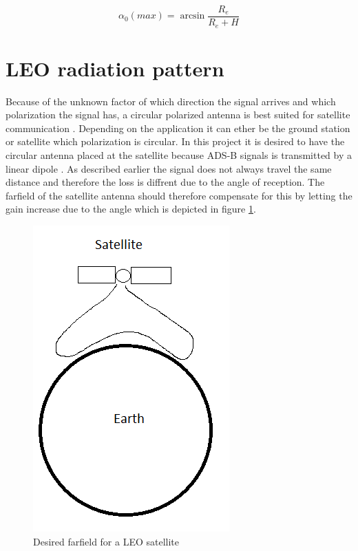\begin{equation}
\alpha_0(max) = \arcsin{\frac{R_e}{R_e+H}}
\end{equation}
\label{eq:max_cov} 

\section{LEO radiation pattern}
Because of the unknown factor of which direction the signal arrives and which polarization the signal has, a circular polarized antenna is best suited for satellite communication \citep{Balanis2005}. Depending on the application it can ether be the ground station or satellite which polarization is circular. In this project it is desired to have the circular antenna placed at the satellite because ADS-B signals is transmitted by a linear dipole \citep{itu2017}. As described earlier the signal does not always travel the same distance and therefore the loss is diffrent due to the angle of reception. The farfield of the satellite antenna should therefore compensate for this by letting the gain increase due to the angle which is depicted in figure \ref{fig:sat_farfield}.   

\begin{figure}[H]
\centering 
\includegraphics[scale = 0.7]{figures/linkbudget/sat_farfield.png}
\caption{Desired farfield for a LEO satellite}
\label{fig:sat_farfield}
\end{figure} 

